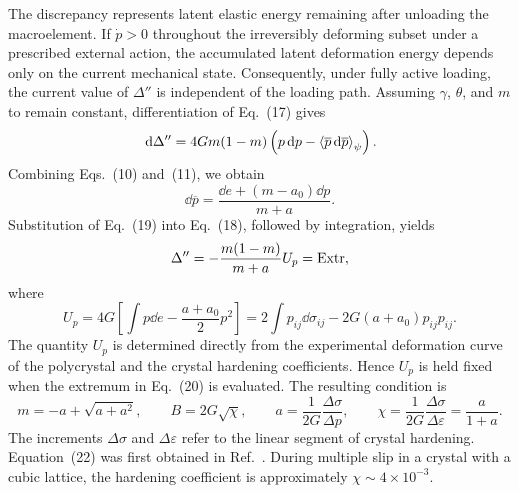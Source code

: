 The discrepancy represents latent elastic energy remaining after unloading the macroelement. If $\dot p>0$ throughout the irreversibly deforming subset under a prescribed external action, the accumulated latent deformation energy depends only on the current mechanical state. Consequently, under fully active loading, the current value of $\Delta''$ is independent of the loading path. Assuming $\gamma$, $\theta$, and $m$ to remain constant, differentiation of Eq.~(17) gives
\begin{equation}
 \dd\Delta''
 =4Gm(1-m)\left(p\dd p-\avg[\psi]{\overline p\dd\overline p}\right).
\end{equation}
Combining Eqs.~(10) and~(11), we obtain
\begin{equation}
 \dd\overline p
 =\frac{\dd e+(m-a_0)\dd p}{m+a}.
\end{equation}
Substitution of Eq.~(19) into Eq.~(18), followed by integration, yields
\begin{equation}
 \Delta''=-\frac{m(1-m)}{m+a}U_p=\Extr,
\end{equation}
where
\begin{equation}
 U_p
 =4G\left[\int p\dd e-\frac{a+a_0}{2}p^2\right]
 =2\int p_{ij}\dd\sigma_{ij}-2G(a+a_0)p_{ij}p_{ij}.
\end{equation}
The quantity $U_p$ is determined directly from the experimental deformation curve of the polycrystal and the crystal hardening coefficients. Hence $U_p$ is held fixed when the extremum in Eq.~(20) is evaluated. The resulting condition is
\begin{equation}
 m=-a+\sqrt{a+a^2},
 \qquad
 B=2G\sqrt{\chi},
 \qquad
 a=\frac{1}{2G}\frac{\Delta\sigma}{\Delta p},
 \qquad
 \chi=\frac{1}{2G}\frac{\Delta\sigma}{\Delta\varepsilon}
      =\frac{a}{1+a}.
\end{equation}
The increments $\Delta\sigma$ and $\Delta\varepsilon$ refer to the linear segment of crystal hardening. Equation~(22) was first obtained in Ref.~\cite{marina1997}. During multiple slip in a crystal with a cubic lattice, the hardening coefficient is approximately $\chi\sim4\times10^{-3}$.

